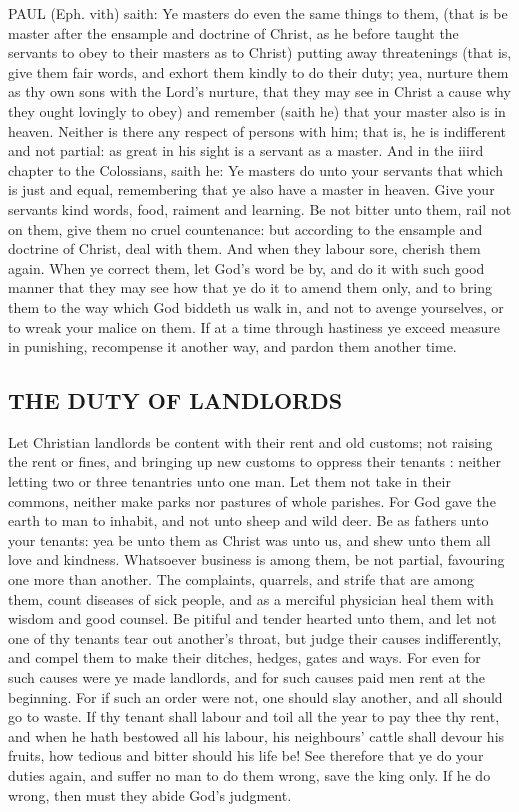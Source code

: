 PAUL (Eph. vith) saith: Ye masters do even the same 
things to them, (that is be master after the ensample 
and doctrine of Christ, as he before taught the servants to 
obey to their masters as to Christ) putting away threatenings
(that is, give them fair words, and exhort them 
kindly to do their duty; yea, nurture them as thy own 
sons with the Lord's nurture, that they may see in Christ 
a cause why they ought lovingly to obey) and remember 
(saith he) that your master also is in heaven. Neither is 
there any respect of persons with him; that is, he is indifferent
and not partial: as great in his sight is a servant 
as a master. And in the iiird chapter to the Colossians, 
saith he: Ye masters do unto your servants that which is 
just and equal, remembering that ye also have a master in 
heaven. Give your servants kind words, food, raiment 
and learning. Be not bitter unto them, rail not on them, 
give them no cruel countenance: but according to the ensample
and doctrine of Christ, deal with them. And 
when they labour sore, cherish them again. When ye 
correct them, let God's word be by, and do it with such 
good manner that they may see how that ye do it to amend 
them only, and to bring them to the way which God 
biddeth us walk in, and not to avenge yourselves, or to 
wreak your malice on them. If at a time through hastiness 
ye exceed measure in punishing, recompense it another 
way, and pardon them another time. 


\subsection*{THE DUTY OF LANDLORDS}

Let Christian landlords be content with their rent and 
old customs; not raising the rent or fines, and bringing 
up new customs to oppress their tenants : neither letting 
two or three tenantries unto one man. Let them not take 
in their commons, neither make parks nor pastures of 
whole parishes. For God gave the earth to man to inhabit, 
and not unto sheep and wild deer. Be as fathers unto 
your tenants: yea be unto them as Christ was unto us, 
and shew unto them all love and kindness. Whatsoever 
business is among them, be not partial, favouring one more 
than another. The complaints, quarrels, and strife that 
are among them, count diseases of sick people, and as a 
merciful physician heal them with wisdom and good counsel.
Be pitiful and tender hearted unto them, and let not 
one of thy tenants tear out another's throat, but judge 
their causes indifferently, and compel them to make their 
ditches, hedges, gates and ways. For even for such causes 
were ye made landlords, and for such causes paid men rent 
at the beginning. For if such an order were not, one 
should slay another, and all should go to waste. If thy 
tenant shall labour and toil all the year to pay thee thy rent, 
and when he hath bestowed all his labour, his neighbours' 
cattle shall devour his fruits, how tedious and bitter should 
his life be! See therefore that ye do your duties again, and 
suffer no man to do them wrong, save the king only. If 
he do wrong, then must they abide God's judgment. 


